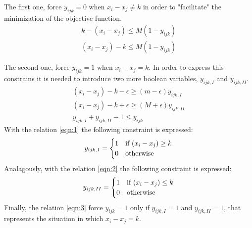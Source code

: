 The first one, force $ y_{ijk} = 0 $ when $ x_{i} - x_{j} \ne k $ in order to "facilitate" the minimization of the objective function.
\begin{gather*}
k - (x_{i} - x_{j}) \le M (1-y_{ijk}) \\
(x_{i} - x_{j}) - k \le M (1-y_{ijk})
\end{gather*}

The second one, force $ y_{ijk} = 1 $ when $ x_{i} - x_{j} = k $.
In order to express this constrains it is needed to introduce two more boolean variables, $ y_{ijk, I} $ and $ y_{ijk, II} $.
\begin{gather}
\label{eqn:1}
(x_{i} - x_{j}) - k - \epsilon \ge (m - \epsilon) y_{ijk, I} \\
\label{eqn:2}
(x_{i} - x_{j}) - k + \epsilon \ge (M + \epsilon) y_{ijk, II} \\
\label{eqn:3}
y_{ijk, I} + y_{ijk, II} - 1 \le y_{ijk}
\end{gather}
With the relation \ref{eqn:1} the following constraint is expressed:
\[
y_{ijk, I} = 
\begin{cases}
1	&	\text{if $ (x_{i} - x_{j}) \ge k $}	\\
0	&	\text{otherwise}
\end{cases}
\]
Analagously, with the relation \ref{eqn:2} the following constraint is expressed:
\[
y_{ijk, II} = 
\begin{cases}
1	&	\text{if $ (x_{i} - x_{j}) \le k $}	\\
0	&	\text{otherwise}
\end{cases}
\]
Finally, the relation \ref{eqn:3} force $ y_{ijk} = 1 $ only if $ y_{ijk, I} = 1 $ and $ y_{ijk, II} = 1 $, that represents the situation in which $ x_{i} - x_{j} = k $.